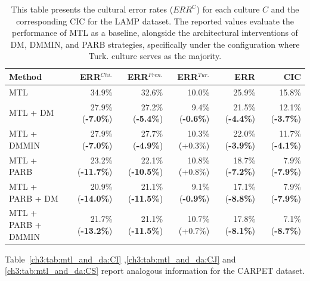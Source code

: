 \begin{table} [H]
\centering
\scriptsize
\begin{tabular}{lrrrrr}
\toprule
\textbf{Method} & \textbf{ERR$^{Chi.}$} & \textbf{ERR$^{Fren.}$} & \textbf{ERR$^{Tur.}$} & \textbf{ERR} & \textbf{CIC} \\
\midrule			
MTL          & 34.9\% & 32.6\% & 10.0\% & 25.9\% & 15.8\% \\
MTL +  DM    & 27.9\% (\textbf{-7.0\%}) & 27.2\% (\textbf{-5.4\%}) & 9.4\% (\textbf{-0.6\%}) & 21.5\% (\textbf{-4.4\%}) & 12.1\% (\textbf{-3.7\%}) \\
MTL +  DMMIN & 27.9\% (\textbf{-7.0\%}) & 27.7\% (\textbf{-4.9\%}) & 10.3\% (+0.3\%) & 22.0\% (\textbf{-3.9\%}) & 11.7\% (\textbf{-4.1\%}) \\
\hline
MTL + PARB     & 23.2\% (\textbf{-11.7\%}) & 22.1\% (\textbf{-10.5\%}) & 10.8\% (+0.8\%) & 18.7\% (\textbf{-7.2\%}) & 7.9\% (\textbf{-7.9\%}) \\
MTL + PARB + DM & 20.9\% (\textbf{-14.0\%}) & 21.1\% (\textbf{-11.5\%}) & 9.1\% (\textbf{-0.9\%}) & 17.1\% (\textbf{-8.8\%}) & 7.9\% (\textbf{-7.9\%}) \\
MTL + PARB + DMMIN & 21.7\% (\textbf{-13.2\%}) & 21.1\% (\textbf{-11.5\%}) & 10.7\% (+0.7\%) & 17.8\% (\textbf{-8.1\%}) & 7.1\% (\textbf{-8.7\%}) \\
\bottomrule
\end{tabular}
\caption{This table presents the cultural error rates ($ERR^C$) for each culture $C$ and the corresponding CIC for the LAMP dataset. The reported values evaluate the performance of MTL as a baseline, alongside the architectural interventions of DM, DMMIN, and PARB strategies, specifically under the configuration where Turk. culture serves as the majority.}
\label{ch3:tab:mtl_and_da:LT}
\end{table}
%
Table~\ref{ch3:tab:mtl_and_da:CI} ,\ref{ch3:tab:mtl_and_da:CJ} and \ref{ch3:tab:mtl_and_da:CS} report analogous information for the CARPET dataset.
%
